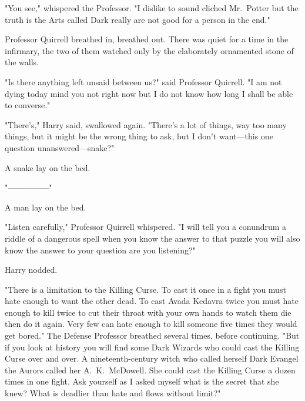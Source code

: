 "You see," whispered the Professor. "I dislike to sound cliched{\el}
Mr.~Potter{\el} but the truth is{\el} the Arts called Dark{\el} really
are not good for a person{\el} in the end."

Professor Quirrell breathed in, breathed out. There was quiet for a time in the
infirmary, the two of them watched only by the elaborately ornamented stone of
the walls.

"Is there anything left{\el} unsaid between us?" said Professor Quirrell. "I
am not dying today{\el} mind you{\el} not right now{\el} but I do not
know how long{\el} I shall be able to converse."

"There's," Harry said, swallowed again. "There's a lot of things, way too many
things, but{\el} it might be the wrong thing to ask, but I don't want---this
one question unanswered---snake?"

A snake lay on the bed.

"---------------"

A man lay on the bed.

"Listen carefully," Professor Quirrell whispered. "I will tell you a
conundrum{\el} a riddle of a dangerous spell{\el} when you know the
answer to that puzzle{\el} you will also know{\el} the answer to your
question{\el} are you listening?"

Harry nodded.

"There is a limitation{\el} to the Killing Curse. To cast it once{\el} in
a fight{\el} you must hate enough{\el} to want the other dead. To cast
Avada{\el} Kedavra twice{\el} you must hate enough{\el} to kill
twice{\el} to cut their throat with your own hands{\el} to watch them
die{\el} then do it again. Very few{\el} can hate enough{\el} to kill
someone{\el} five times{\el} they would{\el} get bored." The Defense
Professor breathed several times, before continuing. "But if you look at
history{\el} you will find some Dark Wizards{\el} who could cast the
Killing Curse{\el} over and over. A nineteenth-century witch{\el} who
called herself Dark Evangel{\el} the Aurors called her A.~K.~McDowell. She
could cast the Killing Curse{\el} a dozen times{\el} in one fight. Ask
yourself{\el} as I asked myself{\el} what is the secret{\el} that she
knew? What is deadlier than hate{\el} and flows without limit?"

